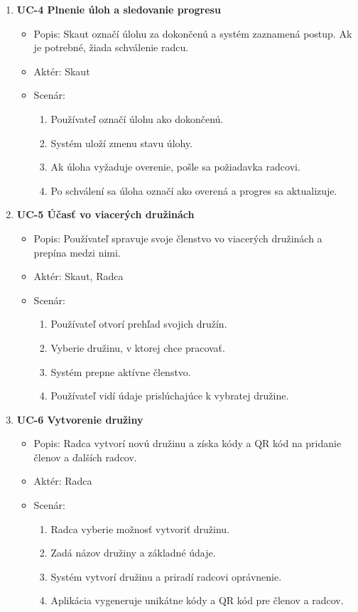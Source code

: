 \begin{enumerate}
    \item \textbf{UC-4 Plnenie úloh a sledovanie progresu}
    \begin{itemize}
        \item Popis: Skaut označí úlohu za dokončenú a systém zaznamená postup. Ak je potrebné, žiada schválenie radcu.
        \item Aktér: Skaut
        \item Scenár:
        \begin{enumerate}
            \item Používateľ označí úlohu ako dokončenú.
            \item Systém uloží zmenu stavu úlohy.
            \item Ak úloha vyžaduje overenie, pošle sa požiadavka radcovi.
            \item Po schválení sa úloha označí ako overená a progres sa aktualizuje.
        \end{enumerate}
    \end{itemize}

    \item \textbf{UC-5 Účasť vo viacerých družinách}
    \begin{itemize}
        \item Popis: Používateľ spravuje svoje členstvo vo viacerých družinách a prepína medzi nimi.
        \item Aktér: Skaut, Radca
        \item Scenár:
        \begin{enumerate}
            \item Používateľ otvorí prehľad svojich družín.
            \item Vyberie družinu, v ktorej chce pracovať.
            \item Systém prepne aktívne členstvo.
            \item Používateľ vidí údaje prislúchajúce k vybratej družine.
        \end{enumerate}
    \end{itemize}

    \item \textbf{UC-6 Vytvorenie družiny}
    \begin{itemize}
        \item Popis: Radca vytvorí novú družinu a získa kódy a QR kód na pridanie členov a ďalších radcov.
        \item Aktér: Radca
        \item Scenár:
        \begin{enumerate}
            \item Radca vyberie možnosť vytvoriť družinu.
            \item Zadá názov družiny a základné údaje.
            \item Systém vytvorí družinu a priradí radcovi oprávnenie.
            \item Aplikácia vygeneruje unikátne kódy a QR kód pre členov a radcov.
        \end{enumerate}
    \end{itemize}


\end{enumerate}
